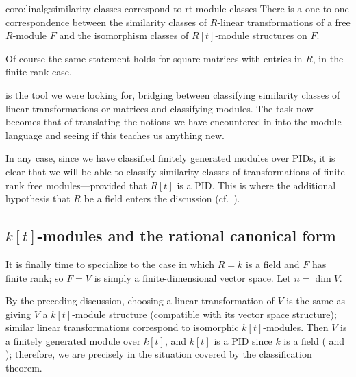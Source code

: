 \begin{coro}{}{coro:linalg:similarity-classes-correspond-to-rt-module-classes}
  There is a one-to-one correspondence between the similarity classes
  of $R$-linear transformations of a free $R$-module $F$ and the
  isomorphism classes of $R[t]$-module structures on $F$.
\end{coro}

Of course the same statement holds for square matrices with entries in
$R$, in the finite rank case.

 is the tool we were looking for, bridging
between classifying similarity classes of linear transformations or
matrices and classifying modules. The task now becomes that of
translating the notions we have encountered in
 into the
module language and seeing if this teaches us anything new.

In any case, since we have classified finitely generated modules over
PIDs, it is clear that we will be able to classify similarity classes
of transformations of finite-rank free modules---provided that $R[t]$
is a PID. This is where the additional hypothesis that $R$ be a field
enters the discussion (cf.\ ).

\subsection{\texorpdfstring{$k[t]$}{k[t]}-modules and the rational
  canonical form}
\label{subsec:linalg:k-t-modules-and-the-rational-canonical-form}
It is finally time to specialize to the case in which $R = k$ is a
field and $F$ has finite rank; so $F = V$ is simply a
finite-dimensional vector space. Let $n = \dim V$.

By the preceding discussion, choosing a linear transformation of $V$
is the same as giving $V$ a $k[t]$-module structure (compatible with
its vector space structure); similar linear transformations correspond
to isomorphic $k[t]$-modules. Then $V$ is a finitely generated module
over $k[t]$, and $k[t]$ is a PID since $k$ is a field
( and
); therefore, we are
precisely in the situation covered by the classification theorem.


